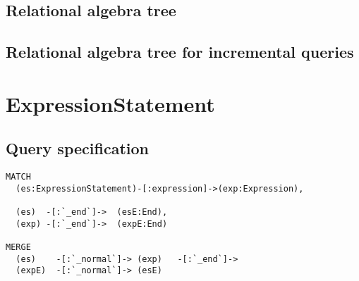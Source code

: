 \subsection*{Relational algebra tree}

\subsection*{Relational algebra tree for incremental queries}

\section{ExpressionStatement}

\subsection*{Query specification}

\begin{lstlisting}
MATCH
  (es:ExpressionStatement)-[:expression]->(exp:Expression),

  (es)  -[:`_end`]->  (esE:End),
  (exp) -[:`_end`]->  (expE:End)

MERGE
  (es)    -[:`_normal`]-> (exp)   -[:`_end`]->
  (expE)  -[:`_normal`]-> (esE)
\end{lstlisting}

